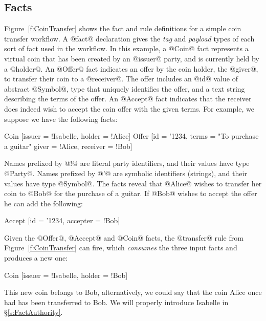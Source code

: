 \subsection{Facts}
\label{s:Facts}
Figure~\ref{f:CoinTransfer} shows the fact and rule definitions for a simple coin transfer workflow. A @fact@ declaration gives the \emph{tag} and \emph{payload} types of each sort of fact used in the workflow. In this example, a @Coin@ fact represents a virtual coin that has been created by an @issuer@ party, and is currently held by a @holder@. An @Offer@ fact indicates an offer by the coin holder, the @giver@, to transfer their coin to a @receiver@. The offer includes an @id@ value of abstract @Symbol@, type that uniquely identifies the offer, and a text string describing the terms of the offer. An @Accept@ fact indicates that the receiver does indeed wish to accept the coin offer with the given terms. For example, we suppose we have the following facts:
\begin{small}
\begin{code}
 Coin   [issuer = !Isabelle, holder = !Alice]
 Offer  [id     = '1234,  terms    = "To purchase a guitar"
         giver  = !Alice, receiver = !Bob]
\end{code}
\end{small}

Names prefixed by @!@ are literal party identifiers, and their values have type @Party@. Names prefixed by @'@ are symbolic identifiers (strings), and their values have type @Symbol@. The facts reveal that @Alice@ wishes to transfer her coin to @Bob@ for the purchase of a guitar. If @Bob@ wishes to accept the offer he can add the following:
\begin{small}
\begin{code}
 Accept [id = '1234, accepter = !Bob]
\end{code}
\end{small}

Given the @Offer@, @Accept@ and @Coin@ facts, the @transfer@ rule from Figure~\ref{f:CoinTransfer} can fire, which \emph{consumes} the three input facts and produces a new one:
\begin{small}
\begin{code}
 Coin   [issuer = !Isabelle, holder = !Bob]
\end{code}
\end{small}

This new coin belongs to Bob, alternatively, we could say that the coin Alice once had has been transferred to Bob. We will properly introduce Isabelle in \S\ref{s:FactAuthority}.

